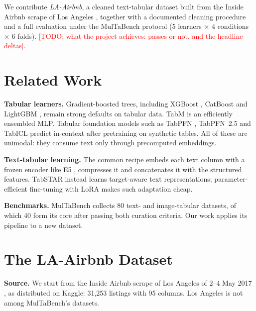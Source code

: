 \documentclass{article}
\newcommand{\todo}[1]{\textcolor{red}{[TODO: #1]}}
\begin{document}
We contribute \emph{LA-Airbnb}, a cleaned text-tabular dataset built from the Inside Airbnb scrape of Los Angeles
\cite{insideairbnb}, together with a documented cleaning procedure and a full evaluation under the MulTaBench
protocol (5 learners $\times$ 4 conditions $\times$ 6 folds). \todo{what the project achieves: passes or not, and
the headline deltas}.

\section{Related Work}

\textbf{Tabular learners.} Gradient-boosted trees, including XGBoost \cite{chen2016xgboost}, CatBoost
\cite{prokhorenkova2018catboost} and LightGBM \cite{ke2017lightgbm}, remain strong defaults on tabular data. TabM
\cite{gorishniy2024tabm} is an efficiently ensembled MLP. Tabular foundation models such as TabPFN
\cite{hollmann2023tabpfn,hollmann2025accurate}, TabPFN~2.5 \cite{grinsztajn2025tabpfn25} and TabICL
\cite{qu2025tabicl} predict in-context after pretraining on synthetic tables. All of these are unimodal: they consume
text only through precomputed embeddings.

\textbf{Text-tabular learning.} The common recipe embeds each text column with a frozen encoder like E5
\cite{wang2022e5}, compresses it and concatenates it with the structured features. TabSTAR
\cite{arazi2025tabstar} instead learns target-aware text representations; parameter-efficient fine-tuning with LoRA
\cite{hu2022lora} makes such adaptation cheap.

\textbf{Benchmarks.} MulTaBench \cite{arazi2026multabench} collects 80 text- and image-tabular datasets, of which 40
form its core after passing both curation criteria. Our work applies its pipeline to a new dataset.

\section{The LA-Airbnb Dataset}

\textbf{Source.} We start from the Inside Airbnb scrape of Los Angeles of 2--4 May 2017 \cite{insideairbnb}, as
distributed on Kaggle: 31,253 listings with 95 columns. Los Angeles is not among MulTaBench's datasets.
\end{document}
